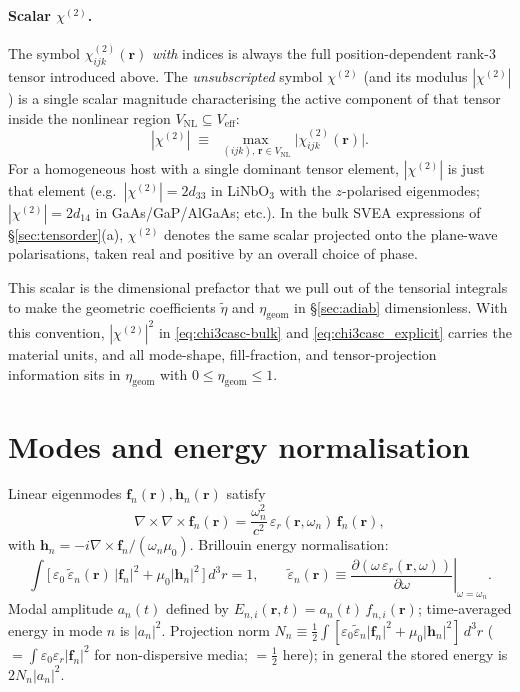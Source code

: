 \documentclass[11pt,a4paper]{article}
\newcommand{\eps}{\varepsilon}
\newcommand{\epstilde}{\widetilde{\varepsilon}}
\newcommand{\bvec}[1]{\mathbf{#1}}
\newcommand{\f}{\bvec{f}}
\newcommand{\h}{\bvec{h}}
\newcommand{\ri}{\bvec{r}}
\newcommand{\dthreer}{\,d^{3}r}
\newcommand{\chitwo}{\chi^{(2)}}
\begin{document}
\paragraph{Scalar $\chitwo$.}
The symbol $\chitwo_{ijk}(\ri)$ \emph{with} indices is always the
full position-dependent rank-3 tensor introduced above. The
\emph{unsubscripted} symbol $\chitwo$ (and its modulus $|\chitwo|$) is a
single scalar magnitude characterising the active component of that
tensor inside the nonlinear region $V_\text{NL}\subseteq V_\text{eff}$:
\begin{equation}
  \boxed{\;|\chitwo|\;\equiv\;\max_{\,(ijk),\,\ri\in V_\text{NL}}
        \bigl|\chitwo_{ijk}(\ri)\bigr|.\;}
  \label{eq:scalar-chi2}
\end{equation}
For a homogeneous host with a single dominant tensor element, $|\chitwo|$
is just that element (e.g.\ $|\chitwo|\!=\!2d_{33}$ in LiNbO$_3$ with the
$z$-polarised eigenmodes; $|\chitwo|\!=\!2d_{14}$ in GaAs/GaP/AlGaAs; etc.). In the bulk SVEA expressions of
\S\ref{sec:tensorder}(a), $\chitwo$ denotes the same scalar projected
onto the plane-wave polarisations, taken real and positive by an overall
choice of phase.

This scalar is the dimensional prefactor that we pull out of the
tensorial integrals to make the geometric coefficients $\widetilde\eta$
and $\eta_\text{geom}$ in \S\ref{sec:adiab} dimensionless. With this
convention, $|\chitwo|^2$ in \eqref{eq:chi3casc-bulk} and
\eqref{eq:chi3casc_explicit} carries the material units, and all
mode-shape, fill-fraction, and tensor-projection information sits in
$\eta_\text{geom}$ with $0\le\eta_\text{geom}\le 1$.

\section{Modes and energy normalisation}

Linear eigenmodes $\f_n(\ri),\h_n(\ri)$ satisfy
\begin{equation}
  \nabla\!\times\!\nabla\!\times\!\f_n(\ri)
  =\frac{\omega_n^2}{c^2}\,\eps_r(\ri,\omega_n)\,\f_n(\ri),
\end{equation}
with $\h_n=-i\nabla\!\times\!\f_n/(\omega_n\mu_0)$. Brillouin energy normalisation:
\begin{equation}
  \int\!\!\bigl[\,\eps_0\,\epstilde_n(\ri)\,|\f_n|^2+\mu_0|\h_n|^2\,\bigr]\dthreer=1,
  \qquad
  \epstilde_n(\ri)\equiv\left.\frac{\partial(\omega\,\eps_r(\ri,\omega))}{\partial\omega}\right|_{\omega=\omega_n}.
\label{eq:Brillouin}
\end{equation}
Modal amplitude $a_n(t)$ defined by $E_{n,i}(\ri,t)=a_n(t)\,f_{n,i}(\ri)$; time-averaged energy in mode $n$ is $|a_n|^2$.
Projection norm $N_n\equiv\tfrac12\int[\eps_0\epstilde_n|\f_n|^2+\mu_0|\h_n|^2]\dthreer$
($=\int\eps_0\eps_r|\f_n|^2$ for non-dispersive media; $=\tfrac12$ here);
in general the stored energy is $2N_n|a_n|^2$.
\end{document}
